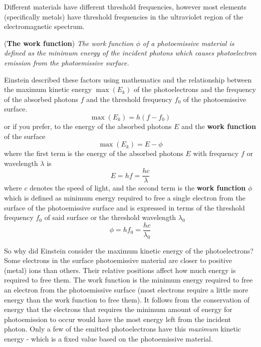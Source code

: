 Different materials have different threshold frequencies, however most elements (specifically metals) have threshold frequencies in the ultraviolet region of the electromagnetic spectrum.

\begin{definition}{(\textbf{The work function})}
\textit{The work function $\phi$ of a photoemissive material is defined as the minimum energy of the incident photons which causes photoelectron emission from the photoemissive surface.}
\end{definition}

Einstein described these factors using mathematics and the relationship between the maximum kinetic energy $\max(E_k)$ of the photoelectrons and the frequency of the absorbed photons $f$ and the threshold frequency $f_0$ of the photoemissive surface. 
\begin{equation}
    \max(E_k) = h(f - f_0)
\end{equation}
or if you prefer, to the energy of the absorbed photons $E$ and the \textbf{work function} of the surface
\begin{equation}
    \max(E_k) = E - \phi
\end{equation}
where the first term is the energy of the absorbed photons $E$ with frequency $f$ or wavelength $\lambda$ is
\begin{equation*}
    E = hf = \frac{h c}{\lambda}
\end{equation*}
where $c$ denotes the speed of light, and the second term is the \textbf{work function} $\phi$ which is defined as minimum energy required to free a single electron from the surface of the photoemissive surface and is expressed in terms of the threshold frequency $f_0$ of said surface or the threshold wavelength $\lambda_0$
\begin{equation}
    \phi = hf_0 = \frac{hc}{\lambda_0}
\end{equation}

So why did Einstein consider the maximum kinetic energy of the photoelectrons? Some electrons in the surface photoemissive material are closer to positive (metal) ions than others. Their relative positions affect how much energy is required to free them.  The work function is the minimum energy required to free an electron from the photoemissive surface (most electrons require a little more energy than the work function to free them). It follows from the conservation of energy that the electrons that requires the minimum amount of energy for photoemission to occur would have the most energy left from the incident photon. Only a few of the emitted photoelectrons have this \textit{maximum} kinetic energy - which is a fixed value based on the photoemissive material. 

